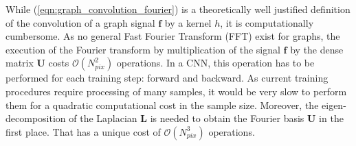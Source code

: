 \documentclass[final,twocolumn,3p,times,authoryear]{elsarticle}
\newcommand{\TK}[1]{{\color{red}{TK:#1}}}
\newcommand{\eqnref}[1]{(\ref{eqn:#1})}
\renewcommand{\b}[1]{{\bm{#1}}}   %
\newcommand{\1}{\b{1}}              %
\newcommand{\0}{\b{0}}              %
\renewcommand{\L}{\b{L}}
\newcommand{\U}{\b{U}}
\newcommand{\f}{\b{f}}
\newcommand{\bO}{\mathcal{O}}
\begin{document}
While \eqnref{graph_convolution_fourier} is a theoretically well justified definition of the convolution of a graph signal $\f$ by a kernel $h$, it is computationally cumbersome.
As no general Fast Fourier Transform (FFT) exist for graphs, the execution of the Fourier transform by multiplication of the signal $\f$ by the dense matrix $\U$ costs $\bO(N_{pix}^2)$ operations.
In a CNN, this operation has to be performed for each training step: forward and backward.
As current training procedures require processing of many samples, it would be very slow to perform them for a quadratic computational cost in the sample size.
Moreover, the eigen-decomposition of the Laplacian $\L$ is needed to obtain the Fourier basis $\U$ in the first place.
That has a unique cost of $\bO(N_{pix}^3)$ operations.
\end{document}
